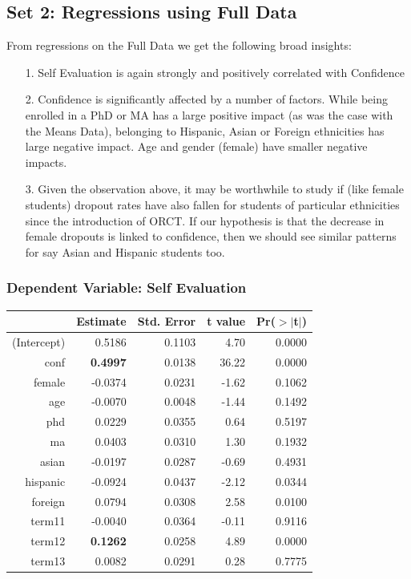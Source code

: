 \documentclass[11pt]{article} %
\begin{document}
\subsection{Set 2: Regressions using Full Data}

From regressions on the Full Data we get the following broad insights:
\begin{itemize}
\item[1.] Self Evaluation is again strongly and positively correlated with Confidence
\item[2.] Confidence is significantly affected by a number of factors. While being enrolled in a PhD or MA has a large  positive impact (as was the case with the Means Data), belonging to Hispanic, Asian or Foreign ethnicities has large negative impact. Age and gender (female) have smaller negative impacts.
\item[3.] Given the observation above, it may be worthwhile to study if  (like female students) dropout rates have also fallen for students of particular ethnicities since the introduction of ORCT. If our hypothesis is that the decrease in female dropouts is linked to confidence, then we should see similar patterns for say Asian and Hispanic students too.
\end{itemize}


\subsubsection{Dependent Variable: Self Evaluation}

\begin{table}[H]
\centering
% 
\begin{tabular}{rrrrr}
  \hline
 & Estimate & Std. Error & t value & Pr($>$$|$t$|$) \\ 
  \hline
(Intercept) & 0.5186 & 0.1103 & 4.70 & 0.0000 \\ 
  conf & \textbf{0.4997} & 0.0138 & 36.22 & 0.0000 \\ 
  female & -0.0374 & 0.0231 & -1.62 & 0.1062 \\ 
  age & -0.0070 & 0.0048 & -1.44 & 0.1492 \\ 
  phd & 0.0229 & 0.0355 & 0.64 & 0.5197 \\ 
  ma & 0.0403 & 0.0310 & 1.30 & 0.1932 \\ 
  asian & -0.0197 & 0.0287 & -0.69 & 0.4931 \\ 
  hispanic & -0.0924 & 0.0437 & -2.12 & 0.0344 \\ 
  foreign & 0.0794 & 0.0308 & 2.58 & 0.0100 \\ 
  term11 & -0.0040 & 0.0364 & -0.11 & 0.9116 \\ 
  term12 &\textbf{ 0.1262} & 0.0258 & 4.89 & 0.0000 \\ 
  term13 & 0.0082 & 0.0291 & 0.28 & 0.7775 \\ 
   \hline
\end{tabular}
\end{table}
\end{document}

